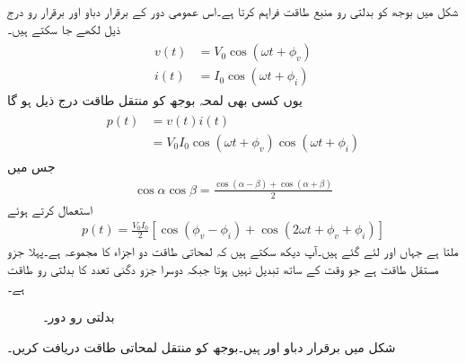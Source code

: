 
شکل  میں بوجھ  کو بدلتی رو منبع  طاقت فراہم کرتا ہے۔اس عمومی دور کے برقرار دباو اور برقرار رو درج ذیل لکھے جا سکتے ہیں۔
\begin{gather}
\begin{aligned}\label{مساوات_طاقت_دباو_رو_عمومی_الف}
v(t)&=V_0\cos(\omega t +\phi_v)\\
i(t)&=I_0\cos(\omega t +\phi_i)
\end{aligned}
\end{gather}
یوں کسی بھی لمحہ بوجھ کو منتقل طاقت درج ذیل ہو گا
\begin{gather}
\begin{aligned}
p(t)&=v(t)i(t)\\
&=V_0 I_0  \cos(\omega t +\phi_v) \cos(\omega t +\phi_i)
\end{aligned}
\end{gather}
جس میں
\begin{align}
\cos \alpha \cos \beta=\frac{\cos(\alpha-\beta)+\cos(\alpha+\beta)}{2}
\end{align}
استعمال کرتے ہوئے
\begin{align}\label{مساوات_طاقت_لمحاتی_طاقت_الف}
p(t)=\frac{V_0 I_0}{2}\left[\cos(\phi_v-\phi_i)+\cos(2\omega t +\phi_v+\phi_i)\right]
\end{align}
ملتا ہے جہاں  اور  لئے گئے ہیں۔آپ دیکھ سکتے ہیں کہ لمحاتی طاقت دو اجزاء کا مجموعہ ہے۔پہلا جزو مستقل طاقت ہے جو وقت کے ساتھ تبدیل نہیں ہوتا جبکہ دوسرا جزو دگنی تعدد کا بدلتی رو طاقت ہے۔  
%
\begin{figure}
\centering
{}
\caption{بدلتی رو دور۔}
\label{شکل_طاقت_پرزے_کو_منتقل}
\end{figure}
شکل  میں برقرار دباو  اور  ہیں۔بوجھ کو منتقل لمحاتی طاقت دریافت کریں۔

